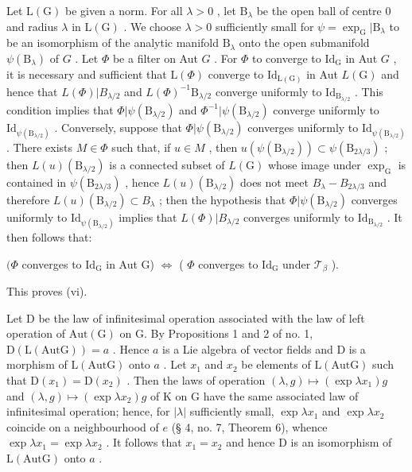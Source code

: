 Let \(\mathrm{L}(\mathrm{G})\) be given a norm. For all \(\lambda > 0\) , let \(\mathrm{B}_{\lambda}\) be the open ball of centre 0 and radius \(\lambda\) in \(\mathrm{L}(\mathrm{G})\) . We choose \(\lambda > 0\) sufficiently small for \(\psi = \exp_{\mathrm{G}}|\mathrm{B}_{\lambda}\) to be an isomorphism of the analytic manifold \(\mathrm{B}_{\lambda}\) onto the open submanifold \(\psi(\mathrm{B}_{\lambda})\) of \(G\) . Let \(\Phi\) be a filter on Aut \(G\) . For \(\Phi\) to converge to \(\mathrm{Id}_{\mathrm{G}}\) in Aut \(G\) , it is necessary and sufficient that \(\mathrm{L}(\Phi)\) converge to \(\mathrm{Id}_{\mathrm{L}(\mathrm{G})}\) in Aut \(L(\mathrm{G})\) and hence that \(L(\Phi)|B_{\lambda/2}\) and \(L(\Phi)^{-1}\mathrm{B}_{\lambda/2}\) converge uniformly to \(\mathrm{Id}_{\mathrm{B}_{\lambda/2}}\) . This condition implies that \(\Phi|\psi(\mathrm{B}_{\lambda/2})\) and \(\Phi^{-1}|\psi(\mathrm{B}_{\lambda/2})\) converge uniformly to \(\mathrm{Id}_{\psi(\mathrm{B}_{\lambda/2})}\) . Conversely, suppose that \(\Phi|\psi(\mathrm{B}_{\lambda/2})\) converges uniformly to \(\mathrm{Id}_{\psi(\mathrm{B}_{\lambda/2})}\) . There exists \(M \in \Phi\) such that, if \(u \in M\) , then \(u(\psi(\mathrm{B}_{\lambda/2})) \subset \psi(\mathrm{B}_{2\lambda/3})\) ; then \(L(u)(\mathrm{B}_{\lambda/2})\) is a connected subset of \(L(\mathrm{G})\) whose image under \(\exp_{\mathrm{G}}\) is contained in \(\psi(\mathrm{B}_{2\lambda/3})\) , hence \(L(u)(\mathrm{B}_{\lambda/2})\) does not meet \(B_{\lambda} - B_{2\lambda/3}\) and therefore \(L(u)(\mathrm{B}_{\lambda/2}) \subset B_{\lambda}\) ; then the hypothesis that \(\Phi|\psi(\mathrm{B}_{\lambda/2})\) converges uniformly to \(\mathrm{Id}_{\psi(\mathrm{B}_{\lambda/2})}\) implies that \(L(\Phi)|B_{\lambda/2}\) converges uniformly to \(\mathrm{Id}_{\mathrm{B}_{\lambda/2}}\) . It then follows that:

\((\Phi\) converges to \(\mathrm{Id}_{\mathrm{G}}\) in Aut G) \(\Leftrightarrow\) ( \(\Phi\) converges to \(\mathrm{Id}_{\mathrm{G}}\) under \(\mathcal{T}_{\beta}\) ).

This proves (vi).

Let D be the law of infinitesimal operation associated with the law of left operation of \(\mathrm{Aut(G)}\) on G. By Propositions 1 and 2 of no. 1, \(\mathrm{D(L(AutG))} = a\) . Hence \(a\) is a Lie algebra of vector fields and D is a morphism of \(\mathrm{L(AutG)}\) onto \(a\) . Let \(x_{1}\) and \(x_{2}\) be elements of \(\mathrm{L(AutG)}\) such that \(\mathrm{D}(x_1) = \mathrm{D}(x_2)\) . Then the laws of operation \((\lambda, g) \mapsto (\exp \lambda x_1)g\) and \((\lambda, g) \mapsto (\exp \lambda x_2)g\) of K on G have the same associated law of infinitesimal operation; hence, for \(|\lambda|\) sufficiently small, \(\exp \lambda x_1\) and \(\exp \lambda x_2\) coincide on a neighbourhood of \(e\) (§ 4, no. 7, Theorem 6), whence \(\exp \lambda x_1 = \exp \lambda x_2\) . It follows that \(x_1 = x_2\) and hence D is an isomorphism of \(\mathrm{L(AutG)}\) onto \(a\) .

